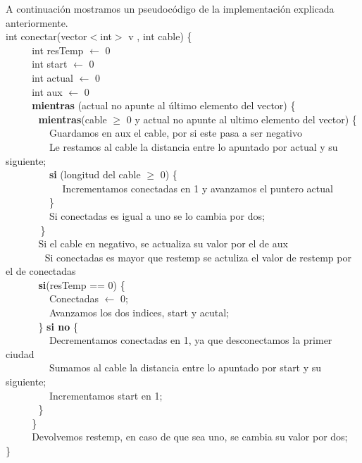 A continuación mostramos un pseudocódigo de la implementación explicada anteriormente. \\

int conectar(vector$<$int$>$ v , int cable) \{ \\
$~~~~~~~~~~~~$int resTemp $\leftarrow$ 0 \\
$~~~~~~~~~~~~$int start $\leftarrow$ 0 \\
$~~~~~~~~~~~~$int actual $\leftarrow$ 0 \\
$~~~~~~~~~~~~$int aux $\leftarrow$ 0 \\
$~~~~~~~~~~~~$\textbf{mientras} (actual no apunte al último elemento del vector) \{    \\
$~~~~~~~~~~~~~~~$\textbf{mientras}(cable $\geq$ 0 y actual no apunte al ultimo elemento del vector) \{   \\
$~~~~~~~~~~~~~~~~~~~~$Guardamos en aux el cable, por si este pasa a ser negativo \\
$~~~~~~~~~~~~~~~~~~~~$Le restamos al cable la distancia entre lo apuntado por actual y su siguiente; \\
$~~~~~~~~~~~~~~~~~~~~$\textbf{si} (longitud del cable $\geq$ 0) \{  \\
$~~~~~~~~~~~~~~~~~~~~~~~~~~$Incrementamos conectadas en 1 y avanzamos el puntero actual 
$~~~~~~~~~~~~~~~~~~~~$\} \\
$~~~~~~~~~~~~~~~~~~~~$Si conectadas es igual a uno se lo cambia por dos;  \\
$~~~~~~~~~~~~~~~~$\}\\
$~~~~~~~~~~~~~~~$Si el cable en negativo, se actualiza su valor por el de aux\\
$~~~~~~~~~~~~~~~~~~$Si conectadas es mayor que restemp se actuliza el valor de restemp por el de conectadas\\
$~~~~~~~~~~~~~~~$\textbf{si}(resTemp == 0) \{   \\
$~~~~~~~~~~~~~~~~~~~~$Conectadas  $\leftarrow$ 0; \\
$~~~~~~~~~~~~~~~~~~~~$Avanzamos los dos indices, start y acutal;  \\
$~~~~~~~~~~~~~~~$\} \textbf{si no} \{ \\
$~~~~~~~~~~~~~~~~~~~~$Decrementamos conectadas en 1, ya que desconectamos la primer ciudad \\
$~~~~~~~~~~~~~~~~~~~~$Sumamos al cable la distancia entre lo apuntado por start y su siguiente;\\
$~~~~~~~~~~~~~~~~~~~~$Incrementamos start en 1;  \\
$~~~~~~~~~~~~~~~$\} \\
$~~~~~~~~~~~~$\} \\
$~~~~~~~~~~~~$Devolvemos restemp, en caso de que sea uno, se cambia su valor por dos;  \\
\}\\

